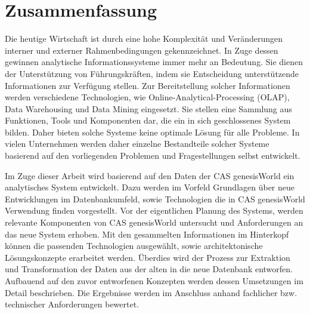 
\chapter*{\centering Zusammenfassung}

Die heutige Wirtschaft ist durch eine hohe Komplexität und Veränderungen interner und externer Rahmenbedingungen gekennzeichnet. In Zuge dessen gewinnen analytische Informationssysteme immer mehr an Bedeutung. Sie dienen der Unterstützung von Führungskräften, indem sie Entscheidung unterstützende Informationen zur Verfügung stellen. Zur Bereitstellung solcher Informationen werden verschiedene Technologien, wie Online-Analytical-Processing (OLAP), Data Warehousing und Data Mining eingesetzt. Sie stellen eine Sammlung aus Funktionen, Tools und Komponenten dar, die ein in sich geschlossenes System bilden. Daher bieten solche Systeme keine optimale Lösung für alle Probleme. In vielen Unternehmen werden daher einzelne Bestandteile solcher Systeme basierend auf den vorliegenden Problemen und Fragestellungen selbst entwickelt.

Im Zuge dieser Arbeit wird basierend auf den Daten der CAS genesisWorld ein analytisches System entwickelt. Dazu werden im Vorfeld Grundlagen über neue Entwicklungen im Datenbankumfeld, sowie Technologien die in CAS genesisWorld Verwendung finden vorgestellt. Vor der eigentlichen Planung des Systems, werden relevante Komponenten von CAS genesisWorld untersucht und Anforderungen an das neue System erhoben. Mit den gesammelten Informationen im Hinterkopf können die passenden Technologien ausgewählt, sowie architektonische Lösungskonzepte erarbeitet werden. Überdies wird der Prozess zur Extraktion und Transformation der Daten aus der alten in die neue Datenbank entworfen. Aufbauend auf den zuvor entworfenen Konzepten werden dessen Umsetzungen im Detail beschrieben. Die Ergebnisse werden im Anschluss anhand fachlicher bzw. technischer Anforderungen bewertet.